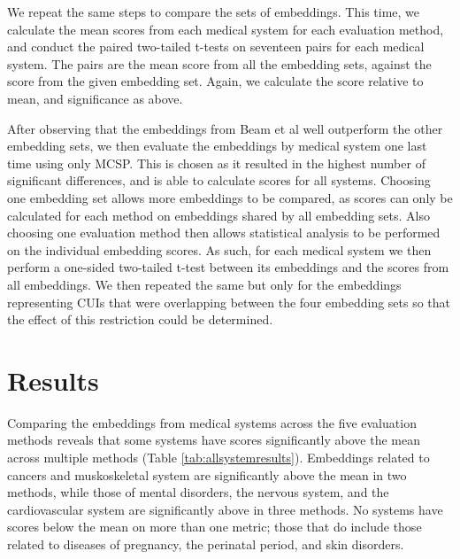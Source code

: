\documentclass[10pt]{article}
\begin{document}
We repeat the same steps to compare the sets of embeddings. This time, we calculate the mean scores from each medical system for each evaluation method, and conduct the paired two-tailed t-tests on seventeen pairs for each medical system. The pairs are the mean score from all the embedding sets, against the score from the given embedding set. Again, we calculate the score relative to mean, and significance as above. 

After observing that the embeddings from Beam et al well outperform the other embedding sets, we then evaluate the embeddings by medical system one last time using only MCSP. This is chosen as it resulted in the highest number of significant differences, and is able to calculate scores for all systems. Choosing one embedding set allows more embeddings to be compared, as scores can only be calculated for each method on embeddings shared by all embedding sets. Also choosing one evaluation method then allows statistical analysis to be performed on the individual embedding scores. As such, for each medical system we then perform a one-sided two-tailed t-test between its embeddings and the scores from all embeddings. We then repeated the same but only for the embeddings representing CUIs that were overlapping between the four embedding sets so that the effect of this restriction could be determined. 




\section{Results}

Comparing the embeddings from medical systems across the five evaluation methods reveals that some systems have scores significantly above the mean across multiple methods (Table \ref{tab:allsystemresults}). Embeddings related to cancers and muskoskeletal system are significantly above the mean in two methods, while those of mental disorders, the nervous system, and the cardiovascular system are significantly above in three methods. No systems have scores below the mean on more than one metric; those that do include those related to diseases of pregnancy, the perinatal period, and skin disorders. 
\end{document}
